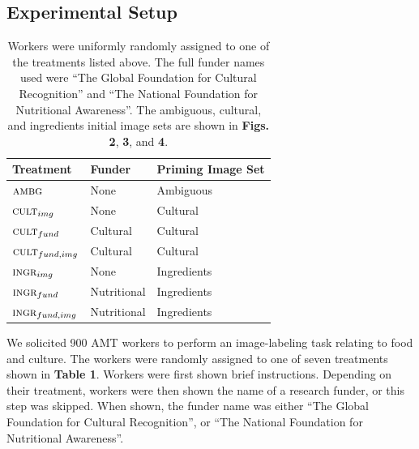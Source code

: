\documentclass[a4paper]{report}
\begin{document}
\subsection*{Experimental Setup}
\begin{table}[t]
\centering
	\begin{tabular}{ l  l  l }
		\hline                       
		Treatment & Funder & Priming Image Set	\\ 
		\hline                       
		$\textsc{ambg}$ & None & Ambiguous\\
		$\textsc{cult}_{img}$ & None & Cultural\\
		$\textsc{cult}_{fund}$ & Cultural & Cultural\\
		$\textsc{cult}_{fund,img}$ & Cultural & Cultural\\
		$\textsc{ingr}_{img}$ & None & Ingredients\\
		$\textsc{ingr}_{fund}$ & Nutritional & Ingredients\\
		$\textsc{ingr}_{fund, img}$ & Nutritional & Ingredients\\
		\hline  
	\end{tabular}


	\begin{addmargin}[4em]{4em}
	\caption{ \footnotesize{ 
		Workers were uniformly randomly assigned to one of the 
		treatments listed above. 
		The full funder names used were 
		``The Global Foundation for Cultural Recognition'' and 
		``The National Foundation for Nutritional Awareness''.  
		The ambiguous, cultural, and ingredients initial image sets are shown 
		in \textbf{Figs. 2}, \textbf{3}, and \textbf{4}.
	}}
	\end{addmargin}
	\label{table:1}
\end{table}

We solicited 900 AMT workers to perform an image-labeling task relating to
food and culture.  The workers were randomly assigned to one of seven 
treatments shown in \textbf{Table 1}.  Workers were first shown brief 
instructions.  Depending on their treatment, workers were then shown the 
name of a research funder, or this step was skipped.  When shown, 
the funder name was either
``The Global Foundation for Cultural Recognition'', or 
``The National Foundation for Nutritional Awareness''.  
\end{document}
